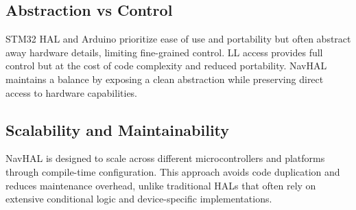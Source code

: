 \subsection{Abstraction vs Control}

STM32 HAL and Arduino prioritize ease of use and portability but often abstract away hardware details, limiting fine-grained control. LL access provides full control but at the cost of code complexity and reduced portability. NavHAL maintains a balance by exposing a clean abstraction while preserving direct access to hardware capabilities.

\subsection{Scalability and Maintainability}

NavHAL is designed to scale across different microcontrollers and platforms through compile-time configuration. This approach avoids code duplication and reduces maintenance overhead, unlike traditional HALs that often rely on extensive conditional logic and device-specific implementations.
